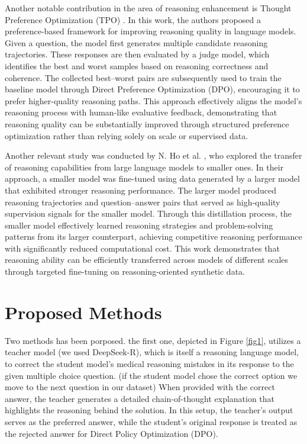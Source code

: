 \documentclass[conference]{IEEEtran}
\begin{document}
Another notable contribution in the area of reasoning enhancement is Thought Preference Optimization (TPO)
\cite{b17}. 
In this work, the authors proposed a preference-based framework for improving reasoning quality in language models. Given a question, the model first generates multiple candidate reasoning trajectories. These responses are then evaluated by a judge model, which identifies the best and worst samples based on reasoning correctness and coherence. The collected best–worst pairs are subsequently used to train the baseline model through Direct Preference Optimization (DPO), encouraging it to prefer higher-quality reasoning paths. This approach effectively aligns the model’s reasoning process with human-like evaluative feedback, demonstrating that reasoning quality can be substantially improved through structured preference optimization rather than relying solely on scale or supervised data.

Another relevant study was conducted by N. Ho et al.
\cite{b18},
who explored the transfer of reasoning capabilities from large language models to smaller ones. In their approach, a smaller model was fine-tuned using data generated by a larger model that exhibited stronger reasoning performance. The larger model produced reasoning trajectories and question–answer pairs that served as high-quality supervision signals for the smaller model. Through this distillation process, the smaller model effectively learned reasoning strategies and problem-solving patterns from its larger counterpart, achieving competitive reasoning performance with significantly reduced computational cost. This work demonstrates that reasoning ability can be efficiently transferred across models of different scales through targeted fine-tuning on reasoning-oriented synthetic data.
          \section{Proposed Methods}
Two methods has been porposed. the first one, depicted in Figure \ref{fig1}, utilizes a teacher model (we used DeepSeek-R), which is itself a reasoning language model, to correct the student model’s medical reasoning mistakes in its response to the given multiple choice question.
(if the student model chose the correct option we move to the next question in our dataset)
When provided with the correct answer, the teacher generates a detailed chain-of-thought explanation that highlights the reasoning behind the solution. In this setup, the teacher’s output serves as the preferred answer, while the student’s original response is treated as the rejected answer for Direct Policy Optimization (DPO).
\end{document}
